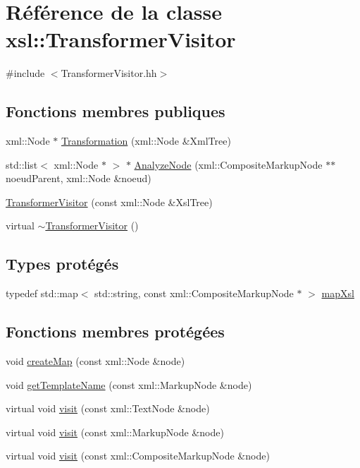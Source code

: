 \hypertarget{classxsl_1_1_transformer_visitor}{
\section{Référence de la classe xsl::TransformerVisitor}
\label{classxsl_1_1_transformer_visitor}
}


{\ttfamily \#include $<$TransformerVisitor.hh$>$}

\subsection*{Fonctions membres publiques}
\begin{DoxyCompactItemize}
\item 
xml::Node $\ast$ \hyperlink{classxsl_1_1_transformer_visitor_ac8897c59997d0a3ab6ec45de1d8f03a1}{Transformation} (xml::Node \&XmlTree)
\item 
std::list$<$ xml::Node $\ast$ $>$ $\ast$ \hyperlink{classxsl_1_1_transformer_visitor_adcf65ab85e23c937fa2f4b2d6b111374}{AnalyzeNode} (xml::CompositeMarkupNode $\ast$$\ast$noeudParent, xml::Node \&noeud)
\item 
\hyperlink{classxsl_1_1_transformer_visitor_aad86d7bfb8a6277ae3f2330feaaaaa8f}{TransformerVisitor} (const xml::Node \&XslTree)
\item 
virtual \hyperlink{classxsl_1_1_transformer_visitor_a431ff5d04fe3918d03e452c7b3d7507c}{$\sim$TransformerVisitor} ()
\end{DoxyCompactItemize}
\subsection*{Types protégés}
\begin{DoxyCompactItemize}
\item 
typedef std::map$<$ std::string, const xml::CompositeMarkupNode $\ast$ $>$ \hyperlink{classxsl_1_1_transformer_visitor_a16924042d3f952765b81dfe634bc2f57}{mapXsl}
\end{DoxyCompactItemize}
\subsection*{Fonctions membres protégées}
\begin{DoxyCompactItemize}
\item 
void \hyperlink{classxsl_1_1_transformer_visitor_aa49e3444c929904e0993b93d4582a192}{createMap} (const xml::Node \&node)
\item 
void \hyperlink{classxsl_1_1_transformer_visitor_afc01d96bf11c3af4bb1e5a4ce461ecb3}{getTemplateName} (const xml::MarkupNode \&node)
\item 
virtual void \hyperlink{classxsl_1_1_transformer_visitor_ac1ac13a7465ee0f1cc65560e00d07c94}{visit} (const xml::TextNode \&node)
\item 
virtual void \hyperlink{classxsl_1_1_transformer_visitor_a396147e30b3678d4020188e2e3ab37af}{visit} (const xml::MarkupNode \&node)
\item 
virtual void \hyperlink{classxsl_1_1_transformer_visitor_addeb8ac079ad785d7b8d89fb45528742}{visit} (const xml::CompositeMarkupNode \&node)
\end{DoxyCompactItemize}
